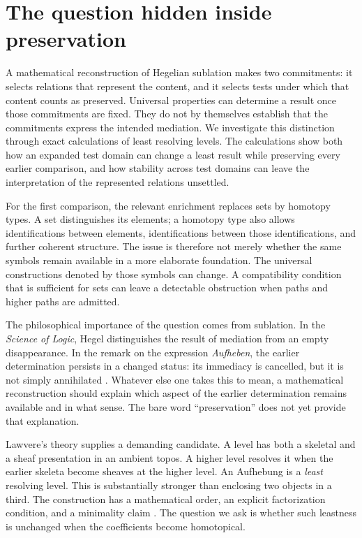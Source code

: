 \section{The question hidden inside preservation}
\label{sec:intro}

A mathematical reconstruction of Hegelian sublation makes two
commitments: it selects relations that represent the content, and it
selects tests under which that content counts as preserved. Universal
properties can determine a result once those commitments are fixed.
They do not by themselves establish that the commitments express the
intended mediation. We investigate this distinction through exact
calculations of least resolving levels. The calculations show both how
an expanded test domain can change a least result while preserving every
earlier comparison, and how stability across test domains can leave the
interpretation of the represented relations unsettled.

For the first comparison, the relevant enrichment replaces
sets by homotopy types. A set distinguishes its elements; a homotopy type also
allows identifications between elements, identifications between those
identifications, and further coherent structure. The issue is therefore not
merely whether the same symbols remain available in a more elaborate
foundation. The universal constructions denoted by those symbols can change.
A compatibility condition that is sufficient for sets can leave a detectable
obstruction when paths and higher paths are admitted.

The philosophical importance of the question comes from sublation. In the
\emph{Science of Logic}, Hegel distinguishes the result of mediation from an
empty disappearance. In the remark on the expression \emph{Aufheben}, the
earlier determination persists in a changed status: its immediacy is cancelled,
but it is not simply annihilated \cite{HegelSublation}. Whatever else one takes
this to mean, a mathematical reconstruction should explain which aspect of the
earlier determination remains available and in what sense. The bare word
``preservation'' does not yet provide that explanation.

Lawvere's theory supplies a demanding candidate. A level has both a skeletal
and a sheaf presentation in an ambient topos. A higher level resolves it when
the earlier skeleta become sheaves at the higher level. An Aufhebung is a
\emph{least} resolving level. This is substantially stronger than enclosing two
objects in a third. The construction has a mathematical order, an explicit
factorization condition, and a minimality claim
\cite{KennettEtAl,Menni}. The question we ask is whether such leastness is
unchanged when the coefficients become homotopical.

